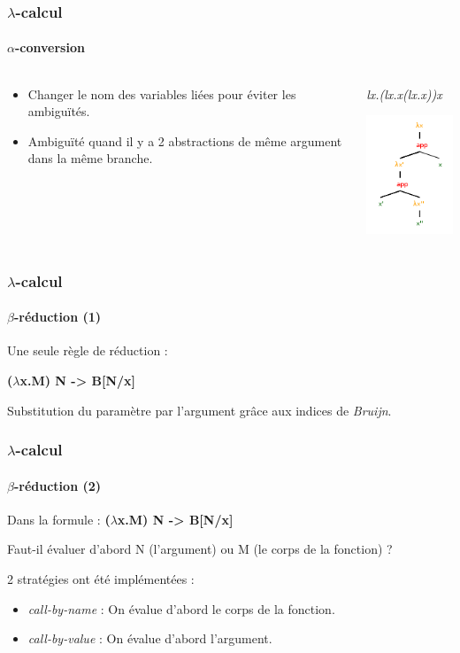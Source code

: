 \documentclass{beamer}
\begin{document}
\begin{frame}
\frametitle{$\lambda$-calcul}
\framesubtitle{$\alpha$-conversion}

\begin{columns}
\begin{column}{5cm}
\begin{itemize}
\item Changer le nom des variables liées pour éviter les ambiguïtés.
\item Ambiguïté quand il y a 2 abstractions de même argument dans la même branche.
\end{itemize}
\end{column}

\begin{column}{5cm}
\begin{center}
\textit{lx.(lx.x(lx.x))x}

\includegraphics{lambda3.png}
\end{center}
\end{column}
\end{columns}

\end{frame}

\begin{frame}
\frametitle{$\lambda$-calcul}
\framesubtitle{$\beta$-réduction (1)}

Une seule règle de réduction :

\medskip

\textbf{($\lambda$x.M) N  -> B[N/x]}

\medskip

Substitution du paramètre par l'argument grâce aux indices de \textit{Bruijn}.

\end{frame}

\begin{frame}
\frametitle{$\lambda$-calcul}
\framesubtitle{$\beta$-réduction (2)}

Dans la formule :
\medskip
\textbf{($\lambda$x.\textcolor[rgb]{1,0,0}{M}) \textcolor[rgb]{0,0,1}{N}  -> B[\textcolor[rgb]{0,0,1}{N}/x]}

Faut-il évaluer d'abord \textcolor[rgb]{0,0,1}{N} (l'argument) ou \textcolor[rgb]{1,0,0}{M} (le corps de la fonction) ?

\bigskip

2 stratégies ont été implémentées :

\begin{itemize}
\item \textit{call-by-name} : On évalue d'abord le corps de la fonction.
\item \textit{call-by-value} : On évalue d'abord l'argument.
\end{itemize}

\end{frame}
\end{document}
